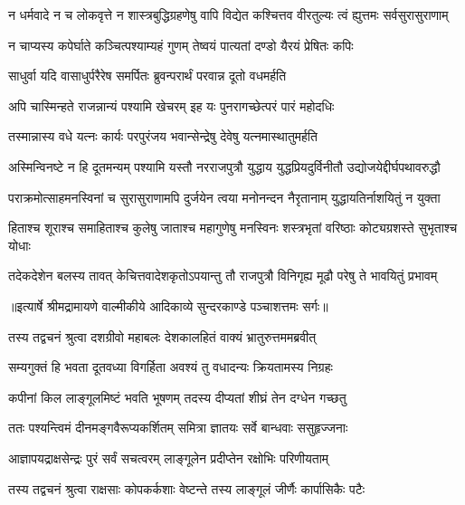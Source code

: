 \fourlineindentedshloka
{न धर्मवादे न च लोकवृत्ते}
{न शास्त्रबुद्धिग्रहणेषु वापि}
{विद्येत कश्चित्तव वीरतुल्यः}
{त्वं ह्युत्तमः सर्वसुरासुराणाम्} %

\twolineshloka
{न चाप्यस्य कपेर्घाते कञ्चित्पश्याम्यहं गुणम्}
{तेष्वयं पात्यतां दण्डो यैरयं प्रेषितः कपिः} %

\twolineshloka
{साधुर्वा यदि वासाधुर्परैरेष समर्पितः}
{ब्रुवन्परार्थं परवान्न दूतो वधमर्हति} %

\twolineshloka
{अपि चास्मिन्हते राजन्नान्यं पश्यामि खेचरम्}
{इह यः पुनरागच्छेत्परं पारं महोदधिः} %

\twolineshloka
{तस्मान्नास्य वधे यत्नः कार्यः परपुरंजय}
{भवान्सेन्द्रेषु देवेषु यत्नमास्थातुमर्हति} %

\fourlineindentedshloka
{अस्मिन्विनष्टे न हि दूतमन्यम्}
{पश्यामि यस्तौ नरराजपुत्रौ}
{युद्धाय युद्धप्रियदुर्विनीतौ}
{उद्योजयेद्दीर्घपथावरुद्धौ} %

\fourlineindentedshloka
{पराक्रमोत्साहमनस्विनां च}
{सुरासुराणामपि दुर्जयेन}
{त्वया मनोनन्दन नैरृतानाम्}
{युद्धायतिर्नाशयितुं न युक्ता} %

\fourlineindentedshloka
{हिताश्च शूराश्च समाहिताश्च}
{कुलेषु जाताश्च महागुणेषु}
{मनस्विनः शस्त्रभृतां वरिष्ठाः}
{कोट्यग्रशस्ते सुभृताश्च योधाः} %

\fourlineindentedshloka
{तदेकदेशेन बलस्य तावत्}
{केचित्तवादेशकृतोऽपयान्तु}
{तौ राजपुत्रौ विनिगृह्य मूढौ}
{परेषु ते भावयितुं प्रभावम्} %


{॥इत्यार्षे श्रीमद्रामायणे वाल्मीकीये आदिकाव्ये सुन्दरकाण्डे पञ्चाशत्तमः सर्गः॥}


\twolineshloka
{तस्य तद्वचनं श्रुत्वा दशग्रीवो महाबलः}
{देशकालहितं वाक्यं भ्रातुरुत्तममब्रवीत्} %

\twolineshloka
{सम्यगुक्तं हि भवता दूतवध्या विगर्हिता}
{अवश्यं तु वधादन्यः क्रियतामस्य निग्रहः} %

\twolineshloka
{कपीनां किल लाङ्गूलमिष्टं भवति भूषणम्}
{तदस्य दीप्यतां शीघ्रं तेन दग्धेन गच्छतु} %

\twolineshloka
{ततः पश्यन्त्विमं दीनमङ्गवैरूप्यकर्शितम्}
{समित्रा ज्ञातयः सर्वे बान्धवाः ससुहृज्जनाः} %

\twolineshloka
{आज्ञापयद्राक्षसेन्द्रः पुरं सर्वं सचत्वरम्}
{लाङ्गूलेन प्रदीप्तेन रक्षोभिः परिणीयताम्} %

\twolineshloka
{तस्य तद्वचनं श्रुत्वा राक्षसाः कोपकर्कशाः}
{वेष्टन्ते तस्य लाङ्गूलं जीर्णैः कार्पासिकैः पटैः} %

